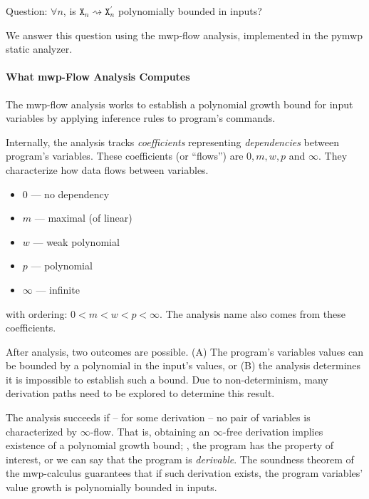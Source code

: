 Question: \(\forall n\), is \(\texttt{X}_n \rightsquigarrow \texttt{X}_n^\prime\) polynomially bounded in inputs?

We answer this question using the mwp-flow analysis, implemented in the pymwp static analyzer.

\paragraph*{What mwp-Flow Analysis Computes}

The mwp-flow analysis works to establish a polynomial growth bound for input variables by applying inference rules to program's commands.

Internally, the analysis tracks \emph{coefficients} representing \emph{dependencies} between program's variables.
These coefficients (or \enquote{flows}) are \(0, m, w, p\) and \(\infty\).
They characterize how data flows between variables.

\begin{itemize}
\item \(0\) --- no dependency
\item \(m\) --- maximal (of linear)
\item \(w\) --- weak polynomial
\item \(p\) --- polynomial
\item \(\infty\) --- infinite
\end{itemize}

with ordering: \(0 < m < w < p < \infty\).
The analysis name also comes from these coefficients.

After analysis, two outcomes are possible.
(A) The program's variables values can be bounded by a polynomial in the input's values, or (B) the analysis determines it is impossible to establish such a bound.
Due to non-determinism, many derivation paths need to be explored to determine this result.

The analysis succeeds if -- for some derivation -- no pair of variables is characterized by \(\infty\)-flow.
That is, obtaining an \(\infty\)-free derivation implies existence of a polynomial growth bound;
\ie, the program has the property of interest, or we can say that the program is \emph{derivable}.
The soundness theorem of the mwp-calculus guarantees that if such derivation exists, the program variables' value growth is polynomially bounded in inputs.

